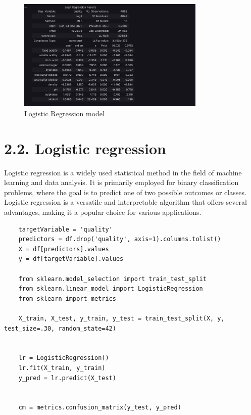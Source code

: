 \documentclass{report}
\begin{document}
\begin{figure}
    \centering
    \includegraphics[width=0.8\textwidth]{images/21.png}
    \caption{Logistic Regression model}
    \label{fig:Logistic Regression model}
\end{figure}

\pagebreak


\section*{2.2. Logistic regression}
Logistic regression is a widely used statistical method in the field of machine learning and data analysis. It is primarily employed for binary classification problems, where the goal is to predict one of two possible outcomes or classes. Logistic regression is a versatile and interpretable algorithm that offers several advantages, making it a popular choice for various applications.


\begin{lstlisting}
    targetVariable = 'quality'
    predictors = df.drop('quality', axis=1).columns.tolist()
    X = df[predictors].values
    y = df[targetVariable].values

    from sklearn.model_selection import train_test_split
    from sklearn.linear_model import LogisticRegression
    from sklearn import metrics

    X_train, X_test, y_train, y_test = train_test_split(X, y, test_size=.30, random_state=42)
    

    lr = LogisticRegression()
    lr.fit(X_train, y_train)
    y_pred = lr.predict(X_test)


    cm = metrics.confusion_matrix(y_test, y_pred)

\end{lstlisting}


\end{document}
